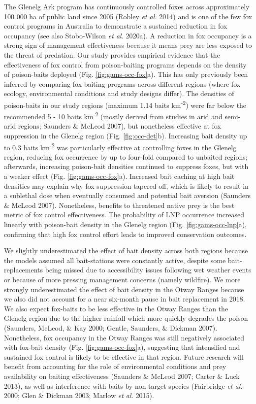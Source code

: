 \documentclass[]{elsarticle} %
\begin{document}
The Glenelg Ark program has continuously controlled foxes across approximately 100 000 ha of public land since 2005 (Robley \emph{et al.} 2014) and is one of the few fox control programs in Australia to demonstrate a sustained reduction in fox occupancy (see also Stobo-Wilson \emph{et al.} 2020a). A reduction in fox occupancy is a strong sign of management effectiveness because it means prey are less exposed to the threat of predation. Our study provides empirical evidence that the effectiveness of fox control from poison-baiting programs depends on the density of poison-baits deployed (Fig. \ref{fig:gams-occ-fox}a). This has only previously been inferred by comparing fox baiting programs across different regions (where fox ecology, environmental conditions and study designs differ). The densities of poison-baits in our study regions (maximum 1.14 baits km\textsuperscript{-2}) were far below the recommended 5 - 10 baits km\textsuperscript{-2} (mostly derived from studies in arid and semi-arid regions; Saunders \& McLeod 2007), but nonetheless effective at fox suppression in the Glenelg region (Fig. \ref{fig:occ-det}b). Increasing bait density up to 0.3 baits km\textsuperscript{-2} was particularly effective at controlling foxes in the Glenelg region, reducing fox occurrence by up to four-fold compared to unbaited regions; afterwards, increasing poison-bait densities continued to suppress foxes, but with a weaker effect (Fig. \ref{fig:gams-occ-fox}a). Increased bait caching at high bait densities may explain why fox suppression tapered off, which is likely to result in a sublethal dose when eventually consumed and potential bait aversion (Saunders \& McLeod 2007). Nonetheless, benefits to threatened native prey is the best metric of fox control effectiveness. The probability of LNP occurrence increased linearly with poison-bait density in the Glenelg region (Fig. \ref{fig:gams-occ-lnp}a), confirming that high fox control effort leads to improved conservation outcomes.

We slightly underestimated the effect of bait density across both regions because the models assumed all bait-stations were constantly active, despite some bait-replacements being missed due to accessibility issues following wet weather events or because of more pressing management concerns (namely wildfire). We more strongly underestimated the effect of bait density in the Otway Ranges because we also did not account for a near six-month pause in bait replacement in 2018. We also expect fox-baits to be less effective in the Otway Ranges than the Glenelg region due to the higher rainfall which more quickly degrades the poison (Saunders, McLeod, \& Kay 2000; Gentle, Saunders, \& Dickman 2007). Nonetheless, fox occupancy in the Otway Ranges was still negatively associated with fox-bait density (Fig. \ref{fig:gams-occ-fox}a), suggesting that intensified and sustained fox control is likely to be effective in that region. Future research will benefit from accounting for the role of environmental conditions and prey availability on baiting effectiveness (Saunders \& McLeod 2007; Carter \& Luck 2013), as well as interference with baits by non-target species (Fairbridge \emph{et al.} 2000; Glen \& Dickman 2003; Marlow \emph{et al.} 2015).
\end{document}
